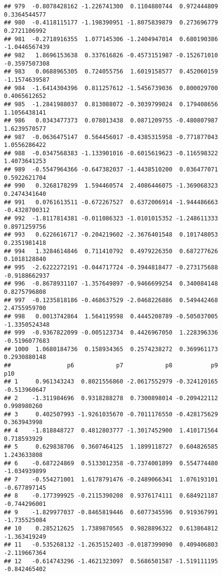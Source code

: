 \documentclass[
]{article}
\begin{document}
\begin{verbatim}
## 979  -0.8078428162 -1.226741300  0.1104880744  0.972444809  0.3364544577
## 980  -0.4118115177 -1.198390951 -1.8075839879  0.273696779  0.2721106992
## 981  -0.2718916355  1.077145306 -1.2404947014  0.680190386 -1.0446567439
## 982   1.8696153638  0.337616826 -0.4573151987 -0.152671010 -0.3597507308
## 983   0.0688965305  0.724055756  1.6019158577  0.452060159 -1.1574639587
## 984  -1.6414304396  0.811257612 -1.5456739036  0.800029700  0.4065612652
## 985  -1.2841988037  0.813088072 -0.3039799024  0.179408656  1.1056438141
## 986   0.0343477373  0.078013438  0.0871209755 -0.480807987  1.6239570577
## 987  -0.0636475147  0.564456017 -0.4385315958 -0.771877043  1.0556286422
## 988  -0.0347568383 -1.133901016 -0.6015619623 -0.116598322  1.4073641253
## 989  -0.5547964366 -0.647382037 -1.4438510200  0.036477071  0.5922621704
## 990   0.3268178299  1.594460574  2.4086446075 -1.369068323  0.2474341640
## 991   0.0761613511 -0.672267527  0.6372006914 -1.944486663 -0.4328700312
## 992  -1.8117814381 -0.011086323 -1.0101015352 -1.248611333  0.8971259756
## 993   0.6226616717 -0.204219602 -2.3676401548  0.101748053  0.2351981418
## 994   1.3284614846  0.711410792  0.4979226350  0.687277626  0.1018128840
## 995  -2.6222272191 -0.044717724 -0.3944818477 -0.273175688 -0.9188662937
## 996  -0.8678931107 -1.357649897 -0.9466699254  0.340084148  0.8275796808
## 997  -0.1235818186 -0.468637529 -2.0468226886  0.549442468  2.4755959700
## 998   0.0013742864  1.564119598  0.4445208789 -0.505037005 -1.3350524348
## 999  -0.9367822099 -0.005123734  0.4426967050  1.228396336 -0.5196077683
## 1000  1.0680184736  0.158934365  0.2574238272  0.369961173  0.2930880148
##                p6            p7            p8           p9          p10
## 1     0.961343243  0.8021556860 -2.0617552979 -0.324120165 -0.513960647
## 2    -1.311984696  0.9318288278  0.7300898014 -0.209422112  0.998980260
## 3     0.402507993 -1.9261035670 -0.7011176550 -0.428175629  0.363943998
## 4    -1.818848727  0.4812803777 -1.3017452900  1.410171564  0.718593929
## 5     0.629838706  0.3607464125  1.1899118727  0.604826585  1.243633808
## 6    -0.687224869  0.5133012358 -0.7374001899  0.554774480 -1.034939899
## 7    -0.554271001  1.6178791476 -0.2489066341  1.076193101 -0.677897145
## 8    -0.177399925 -0.2115390208  0.9376174111  0.684921187 -0.744296001
## 9    -1.829977037 -0.8465819446  0.6077345596  0.919367991 -1.735525084
## 10    0.285212625  1.7389870565  0.9828896322  0.613864812 -1.363419249
## 11   -0.535268132 -1.2635152403 -0.0187399090  0.409406803 -2.119667364
## 12   -0.614743296 -1.4621323097  0.5686501587 -1.519111195 -0.842465402

\end{verbatim}
\end{document}
